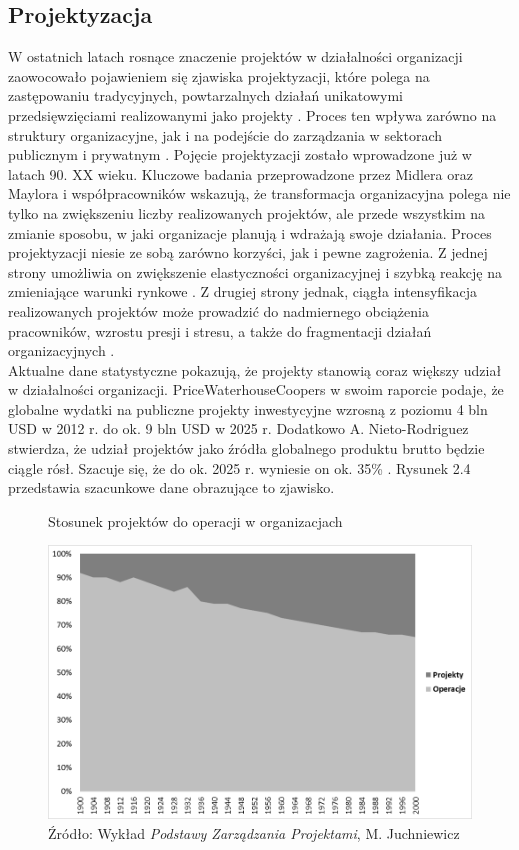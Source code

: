 \subsection{Projektyzacja}
W ostatnich latach rosnące znaczenie projektów w działalności organizacji zaowocowało pojawieniem się zjawiska projektyzacji, które polega na zastępowaniu tradycyjnych, powtarzalnych działań unikatowymi przedsięwzięciami realizowanymi jako projekty \autocite{Juchniewicz2018}. Proces ten wpływa zarówno na struktury organizacyjne, jak i na podejście do zarządzania w sektorach publicznym i prywatnym \autocite{Midler1995}.
Pojęcie projektyzacji zostało wprowadzone już w latach 90. XX wieku. Kluczowe badania przeprowadzone przez Midlera oraz Maylora i współpracowników \autocite{Maylor2006} wskazują, że transformacja organizacyjna polega nie tylko na zwiększeniu liczby realizowanych projektów, ale przede wszystkim na zmianie sposobu, w jaki organizacje planują i wdrażają swoje działania. Proces projektyzacji niesie ze sobą zarówno korzyści, jak i pewne zagrożenia. Z jednej strony umożliwia on zwiększenie elastyczności organizacyjnej i szybką reakcję na zmieniające warunki rynkowe \autocite{Prawelska2011}. Z drugiej strony jednak, ciągła intensyfikacja realizowanych projektów może prowadzić do nadmiernego obciążenia pracowników, wzrostu presji i stresu, a także do fragmentacji działań organizacyjnych \autocite{Jalocha2012}.
\\
Aktualne dane statystyczne pokazują, że projekty stanowią coraz większy udział w działalności organizacji. PriceWaterhouseCoopers w swoim raporcie podaje, że globalne wydatki na publiczne projekty inwestycyjne wzrosną z poziomu 4 bln USD w 2012 r. do ok. 9 bln USD w 2025 r. \autocite{pwc}
Dodatkowo A. Nieto-Rodriguez stwierdza, że udział projektów jako źródła globalnego produktu brutto będzie ciągle rósł. Szacuje się,
że do ok. 2025 r. wyniesie on ok. 35\% \autocite{Nieto}. Rysunek 2.4 przedstawia szacunkowe dane obrazujące to zjawisko.
\begin{figure}
\centering
\caption{Stosunek projektów do operacji w organizacjach}
\includegraphics[width=14cm]{img/projektyzacja.png}
\caption*{Źródło: Wykład \textit{Podstawy Zarządzania Projektami}, M. Juchniewicz}
\end{figure}
